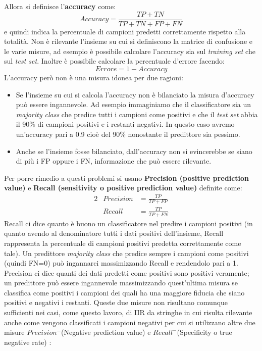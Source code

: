 Allora si definisce l'\textbf{accuracy} come:
\begin{equation*}
Accuracy = \frac{TP + TN}{TP+TN+FP+FN}
\end{equation*}
e quindi indica la percentuale di campioni predetti correttamente rispetto alla totalità. Non è rilevante l'insieme su cui si definiscono la matrice di confusione e le varie misure, ad esempio è possibile calcolare l'accuracy sia sul \textit{training set} che sul \textit{test set}. Inoltre è possibile calcolare la percentuale d'errore facendo:
\begin{equation*}
Errore = 1 - Accuracy
\end{equation*}
 L'accuracy però non è una misura idonea per due ragioni:
 \begin{itemize}
 \item Se l'insieme su cui si calcola l'accuracy non è bilanciato la misura d'accuracy può essere ingannevole. Ad esempio immaginiamo che il  classificatore sia un \textit{majority class} che predice tutti i campioni come positivi e che il \textit{test set} abbia il 90\% di campioni positivi e i restanti negativi. In questo caso avremo un'accuracy pari a 0.9 cioè del 90\% nonostante il predittore sia pessimo.
 \item Anche se l'insieme fosse bilanciato, dall'accuracy non si evincerebbe se siano di più i FP oppure i FN, informazione che può essere rilevante.
 \end{itemize}
Per porre rimedio a questi problemi si usano \textbf{Precision (positive prediction value)} e \textbf{Recall (sensitivity o positive prediction value)} definite come:
\begin{alignat*}{2}
& Precision &= \frac{TP}{TP+FP}\\
& Recall &= \frac{TP}{TP+FN}
\end{alignat*}
Recall ci dice quanto è buono un classificatore nel predire i campioni positivi (in quanto avendo al denominatore tutti i dati positivi dell'insieme, Recall rappresenta la percentuale di campioni positivi predetta correttamente come tale). Un predittore \textit{majority class} che predice sempre i campioni come positivi (quindi FN=0) può ingannarci massimizzando Recall e rendendolo pari a 1. Precision ci dice quanti dei dati predetti come positivi sono positivi veramente; un predittore può essere ingannevole massimizzando quest'ultima misura se classifica come positivi i campioni dei quali ha una maggiore fiducia che siano positivi e negativi i restanti. Queste due misure non risultano comunque sufficienti nei casi, come questo lavoro, di \ac{IIR} da stringhe in cui risulta rilevante anche come vengono classificati i campioni negativi per cui si utilizzano altre due misure $Precision^{-}$(Negative prediction value) e $Recall^{-}$(Specificity o true negative rate) \cite{Bogdanov08} :
